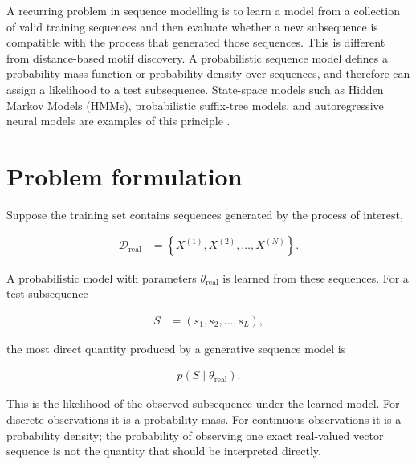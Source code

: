 \documentclass[a4paper]{article}
\title{}
\date{}
\author{Mohammad Rahmani}
\begin{document}
    \maketitle

    A recurring problem in sequence modelling is to learn a model from a collection of valid training sequences and then evaluate whether a new subsequence is compatible with the process that generated those sequences. This is different from distance-based motif discovery. A probabilistic sequence model defines a probability mass function or probability density over sequences, and therefore can assign a likelihood to a test subsequence. State-space models such as Hidden Markov Models (HMMs), probabilistic suffix-tree models, and autoregressive neural models are examples of this principle \cite{murphy-2002-dynamic-bayesian-networks-representation-inference-and-learning,pimentel-clifton-clifton-tarassenko-2014-a-review-of-novelty-detection,bengio-2003-a-neural-probabilistic-language-model}.

    \section{Problem formulation}

        Suppose the training set contains sequences generated by the process of interest,

        \begin{align}
            \mathcal{D}_{\mathrm{real}}
            &=
            \left\{
            X^{(1)},X^{(2)},\dots,X^{(N)}
            \right\}.
        \end{align}

        \noindent
        A probabilistic model with parameters \(\theta_{\mathrm{real}}\) is learned from these sequences. For a test subsequence

        \begin{align}
            S
            &=
            (s_1,s_2,\dots,s_L),
        \end{align}

        \noindent
        the most direct quantity produced by a generative sequence model is

        \begin{align}
            p(S\mid\theta_{\mathrm{real}}).
        \end{align}

        \noindent
        This is the likelihood of the observed subsequence under the learned model. For discrete observations it is a probability mass. For continuous observations it is a probability density; the probability of observing one exact real-valued vector sequence is not the quantity that should be interpreted directly.
\end{document}
